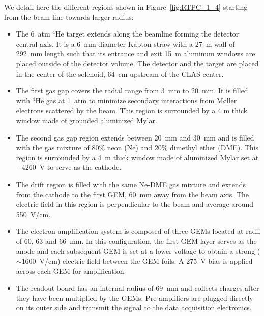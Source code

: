 \documentclass[preprint,5p]{elsarticle}
\begin{document}
We detail here the different regions shown in Figure~\ref{fig:RTPC_1_4} 
starting from the beam line towards larger radius:\\
\begin{itemize}
  \item The 6~atm $^4$He target extends along the beamline forming the detector 
     central axis. It is a 6~mm diameter Kapton straw with a 27~\textmu{}m wall 
     of 292~mm length such that its entrance and exit 15~\textmu{}m aluminum windows 
     are placed outside of the detector volume. The detector and the target are 
     placed in the center of the solenoid, 64~cm upstream of the CLAS center.
   \item The first gas gap covers the radial range from 3~mm to 20~mm. It is 
      filled with $^{4}$He gas at 1~atm to minimize secondary interactions from
      M\o{}ller electrons scattered by the beam. This region is surrounded by 
      a 4 \textmu{}m thick window made of grounded aluminized Mylar.
   \item The second gas gap region extends between 20~mm and 30~mm and is 
      filled with the gas mixture of 80$\%$ neon (Ne) and 20$\%$ dimethyl ether 
      (DME).  This region is surrounded by a 4~\textmu{}m thick window made of 
      aluminized Mylar set at $-4260$~V to serve as the cathode.
   \item The drift region is filled with the same Ne-DME gas mixture and 
      extends from the cathode to the first GEM, 60~mm away from the beam axis.  
      The electric field in this region is perpendicular to the beam and 
      average around 550~V/cm.
   \item The electron amplification system is composed of three GEMs located at 
      radii of 60, 63 and 66~mm. In this configuration, the first GEM layer 
      serves as the anode and each subsequent GEM is set at a lower voltage to
      obtain a strong ($\sim$1600~V/cm) electric field between the GEM foils. A 
      275~V bias is applied across each GEM for amplification.
   \item The readout board has an internal radius of 69~mm and collects charges 
      after they have been multiplied by the GEMs. Pre-amplifiers are plugged 
      directly on its outer side and transmit the signal to the data 
      acquisition electronics.
\end{itemize}
\end{document}
